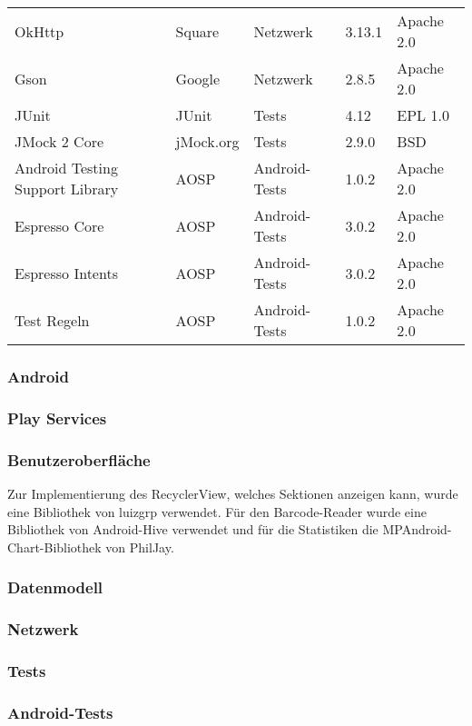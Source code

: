 \begin{tabularx}{\textwidth}{|X|l|l|l|l|}
    OkHttp & Square & Netzwerk & 3.13.1 & Apache 2.0\\   %
    Gson & Google & Netzwerk & 2.8.5 & Apache 2.0\\   %
    \hline

    JUnit & JUnit & Tests & 4.12 & EPL 1.0\\   %
    JMock 2 Core & jMock.org & Tests & 2.9.0 & BSD\\    %
    \hline

    Android Testing Support Library & AOSP & Android-Tests & 1.0.2 & Apache 2.0\\   %
    Espresso Core & AOSP & Android-Tests & 3.0.2 & Apache 2.0\\    %
    Espresso Intents & AOSP & Android-Tests & 3.0.2 & Apache 2.0\\ %
    Test Regeln & AOSP & Android-Tests & 1.0.2 & Apache 2.0\\  %
    \hline
\end{tabularx}

\subsubsection{Android} \label{subsubsec:android-libraries}

\subsubsection{Play Services} \label{subsubsec:play-service-libraries}

\subsubsection{Benutzeroberfläche} \label{subsubsec:ui-libraries}
Zur Implementierung des RecyclerView, welches Sektionen anzeigen kann, wurde eine Bibliothek von luizgrp verwendet.
Für den Barcode-Reader wurde eine Bibliothek von Android-Hive verwendet und für die Statistiken die MPAndroid-Chart-Bibliothek von PhilJay.

\subsubsection{Datenmodell} \label{subsubsec:model-libraries}

\subsubsection{Netzwerk} \label{subsubsec:network-libraries}

\subsubsection{Tests} \label{subsubsec:tests-libraries}

\subsubsection{Android-Tests} \label{subsubsec:android-tests-libraries}
